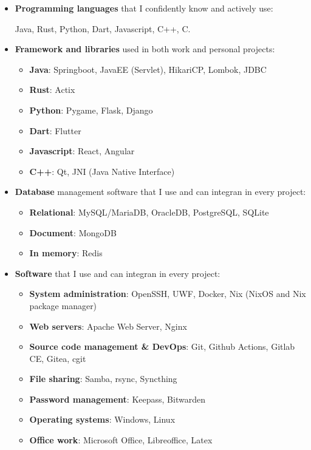 \documentclass{paper}
\begin{document}
\begin{itemize}
    \item \textbf{Programming languages} that I confidently know and actively use:

    Java, Rust, Python, Dart, Javascript, C++, C.

    \item \textbf{Framework and libraries} used in both work and personal projects:

    \begin{itemize}
        \item \textbf{Java}: Springboot, JavaEE (Servlet), HikariCP, Lombok, JDBC
        \item \textbf{Rust}: Actix
        \item \textbf{Python}: Pygame, Flask, Django
        \item \textbf{Dart}: Flutter
        \item \textbf{Javascript}: React, Angular
        \item \textbf{C++}: Qt, JNI (Java Native Interface)
    \end{itemize}

    \item \textbf{Database} management software that I use and can integran in every project:

    \begin{itemize}
        \item \textbf{Relational}: MySQL/MariaDB, OracleDB, PostgreSQL, SQLite
        \item \textbf{Document}: MongoDB
        \item \textbf{In memory}: Redis
    \end{itemize}

    \item \textbf{Software} that I use and can integran in every project:

    \begin{itemize}
        \item \textbf{System administration}: OpenSSH, UWF, Docker, Nix (NixOS and Nix package manager)
        \item \textbf{Web servers}: Apache Web Server, Nginx
        \item \textbf{Source code management \& DevOps}: Git, Github Actions, Gitlab CE, Gitea, cgit
        \item \textbf{File sharing}: Samba, rsync, Syncthing
        \item \textbf{Password management}: Keepass, Bitwarden
        \item \textbf{Operating systems}: Windows, Linux
        \item \textbf{Office work}: Microsoft Office, Libreoffice, Latex
    \end{itemize}
\end{itemize}
\end{document}
